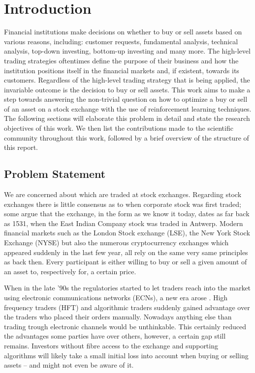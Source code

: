 \chapter{Introduction}

Financial institutions make decisions on whether to buy or sell assets based on various reasons, including: customer requests, fundamental analysis\cite{fundamental-analysis}, technical analysis\cite{technical-analysis}, top-down investing\cite{td-investing}, bottom-up investing\cite{bu-investing} and many more. 
The high-level trading strategies oftentimes define the purpose of their business and how the institution positions itself in the financial markets and, if existent, towards its customers. 
Regardless of the high-level trading strategy that is being applied, the invariable outcome is the decision to buy or sell assets.
This work aims to make a step towards answering the non-trivial question on how to optimize a buy or sell of an asset on a stock exchange with the use of reinforcement learning techniques.
The following sections will elaborate this problem in detail and state the research objectives of this work. 
We then list the contributions made to the scientific community throughout this work, followed by a brief overview of the structure of this report.

\section{Problem Statement}

We are concerned about which are traded at stock exchanges.
Regarding stock exchanges there is little consensus as to when corporate stock was first traded; some argue that the exchange, in the form as we know it today, dates as far back as 1531, when the East Indian Company stock was traded in Antwerp\cite{stock-exchange}.
Modern financial markets such as the London Stock exchange (LSE), the New York Stock Exchange (NYSE) but also the numerous cryptocurrency exchanges which appeared suddenly in the last few year, all rely on the same very same principles as back then.
Every participant is either willing to buy or sell a given amount of an asset to, respectively for, a certain price.

When in the late '90s the regulatories started to let traders reach into the market using electronic communications networks (ECNs), a new era arose \cite{patterson2012dark}.
High frequency traders (HFT) and algorithmic traders suddenly gained advantage over the traders who placed their orders manually.
Nowadays anything else than trading trough electronic channels would be unthinkable.
This certainly reduced the advantages some parties have over others, however, a certain gap still remains.
Investors without fibre access to the exchange and supporting algorithms will likely take a small initial loss into account when buying or selling assets -- and might not even be aware of it.

